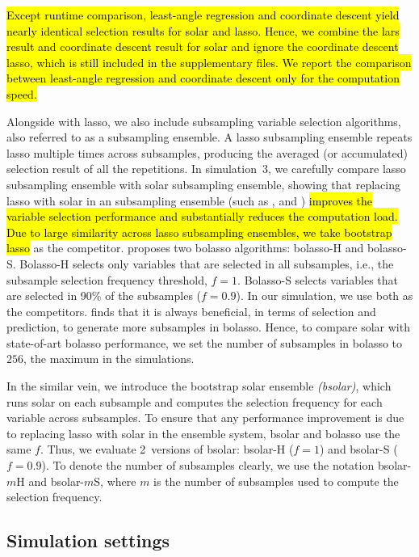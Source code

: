 \documentclass[12pt]{article}
\begin{document}
\hl{Except runtime comparison, least-angle regression and coordinate descent yield nearly identical selection results for solar and lasso. Hence, we combine the lars result and coordinate descent result for solar and ignore the coordinate descent lasso, which is still included in the supplementary files. We report the comparison between least-angle regression and coordinate descent only for the computation speed.}

Alongside with lasso, we also include subsampling variable selection algorithms, also referred to as a subsampling ensemble. A lasso subsampling ensemble repeats lasso multiple times across subsamples, producing the averaged (or accumulated) selection result of all the repetitions. In simulation~3, we carefully compare lasso subsampling ensemble with solar subsampling ensemble, showing that replacing lasso with solar in an subsampling ensemble (such as \citet{bach2008bolasso}, \citet{meinshausen2010stability} and \citet{guo2015improved}) \hl{improves the variable selection performance and substantially reduces the computation load. Due to large similarity across lasso subsampling ensembles, we take bootstrap lasso} \citep{bach2008bolasso} as the competitor. \citet{bach2008bolasso} proposes two bolasso algorithms: bolasso-H and bolasso-S. Bolasso-H selects only variables that are selected in all subsamples, i.e., the subsample selection frequency threshold, $f=1$. Bolasso-S selects variables that are selected in 90\% of the subsamples ($f=0.9$). In our simulation, we use both as the competitors. \citet{bach2008bolasso} finds that it is always beneficial, in terms of selection and prediction, to generate more subsamples in bolasso. Hence, to compare solar with state-of-art bolasso performance, we set the number of subsamples in bolasso to $256$, the maximum in the \citet{bach2008bolasso} simulations.

In the similar vein, we introduce the bootstrap solar ensemble \emph{(bsolar)}, which runs solar on each subsample and computes the selection frequency for each variable across subsamples. To ensure that any performance improvement is due to replacing lasso with solar in the ensemble system, bsolar and bolasso use the same $f$. Thus, we evaluate 2~versions of bsolar: bsolar-H ($f=1$) and bsolar-S ($f=0.9$). To denote the number of subsamples clearly, we use the notation bsolar-$m$H and bsolar-$m$S, where $m$ is the number of subsamples used to compute the selection frequency.

\subsection{Simulation settings}
\end{document}
